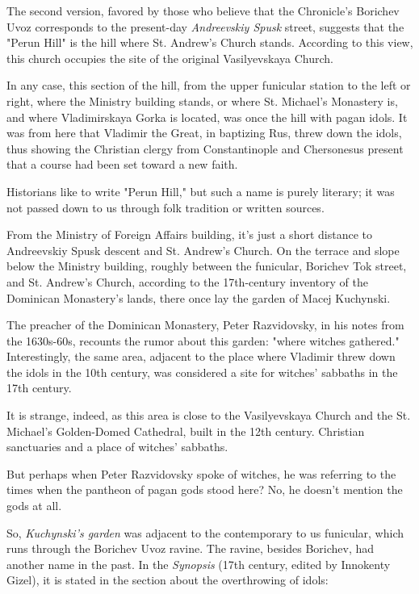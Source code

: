 \documentclass[a5paper,11pt,openany]{article}
\begin{document}
The second version, favored by those who believe that the Chronicle’s Borichev Uvoz corresponds to the present-day \textit{Andreevskiy Spusk} street, suggests that the "Perun Hill" is the hill where St. Andrew’s Church stands. According to this view, this church occupies the site of the original Vasilyevskaya Church.

In any case, this section of the hill, from the upper funicular station to the left or right, where the Ministry building stands, or where St. Michael’s Monastery is, and where Vladimirskaya Gorka is located, was once the hill with pagan idols. It was from here that Vladimir the Great, in baptizing Rus, threw down the idols, thus showing the Christian clergy from Constantinople and Chersonesus present that a course had been set toward a new faith.

Historians like to write "Perun Hill," but such a name is purely literary; it was not passed down to us through folk tradition or written sources.

From the Ministry of Foreign Affairs building, it’s just a short distance to Andreevskiy Spusk descent and St. Andrew's Church. On the terrace and slope below the Ministry building, roughly between the funicular, Borichev Tok street, and St. Andrew’s Church, according to the 17th-century inventory of the Dominican Monastery’s lands, there once lay the garden of Macej Kuchynski.

The preacher of the Dominican Monastery, Peter Razvidovsky, in his notes from the 1630s-60s, recounts the rumor about this garden: "where witches gathered." Interestingly, the same area, adjacent to the place where Vladimir threw down the idols in the 10th century, was considered a site for witches' sabbaths in the 17th century.

It is strange, indeed, as this area is close to the Vasilyevskaya Church and the St. Michael's Golden-Domed Cathedral, built in the 12th century. Christian sanctuaries and a place of witches' sabbaths.

But perhaps when Peter Razvidovsky spoke of witches, he was referring to the times when the pantheon of pagan gods stood here? No, he doesn't mention the gods at all.

So, \textit{Kuchynski's garden} was adjacent to the contemporary to us funicular, which runs through the Borichev Uvoz ravine. The ravine, besides Borichev, had another name in the past. In the \textit{Synopsis}\cite{sinopsis} (17th century, edited by Innokenty Gizel), it is stated in the section about the overthrowing of idols:
\end{document}

